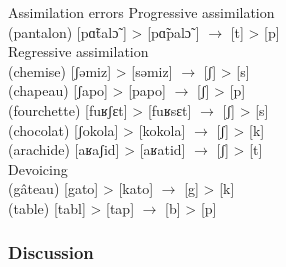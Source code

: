 \documentclass[output=paper,newtxmath,modfonts,nonflat,draftmode]{langsci/langscibook}
\begin{document}
\ea Assimilation errors \label{ex:takam:assimilation_errors}
\ea Progressive assimilation\\
    (pantalon)  [pɑ̃talɔ̃ ] > [pɑ̃palɔ̃ ] $\rightarrow$ [t] > [p]\\
\ex Regressive assimilation\\
    (chemise) [ʃəmiz] > [səmiz] $\rightarrow$ [ʃ] > [s]\\
    (chapeau) [ʃapo] > [papo] $\rightarrow$ [ʃ] > [p]\\
    (fourchette) [fuʁʃɛt] > [fuʁsɛt] $\rightarrow$ [ʃ] > [s]\\
    (chocolat) [ʃokola] > [kokola] $\rightarrow$ [ʃ] > [k]\\ 
    (arachide) [aʁaʃid] > [aʁatid] $\rightarrow$  [ʃ] > [t]\\
\ex Devoicing\\
    (gâteau) [gato] > [kato] $\rightarrow$ [g] > [k]\\
    (table) [tabl] > [tap] $\rightarrow$ [b] > [p]\\
\z
\z




\subsubsection{Discussion} %
\end{document}
